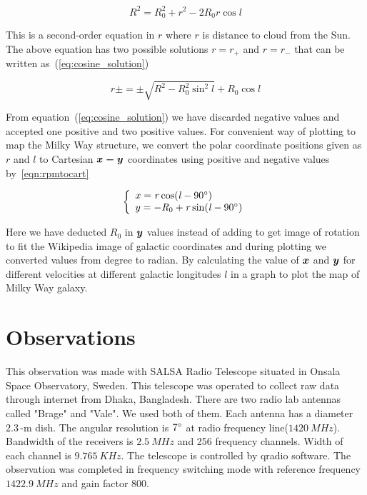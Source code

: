 \documentclass[fleqn,usenatbib]{mnras}
\begin{document}
\begin{equation}
 \mathit{R}^{2}=\mathit{R}_{0}^{2}+\mathit{r}^{2}-2\mathit{R}_{0}\mathit{r}\cos l
 \label{eq:cosine_theory}
\end{equation}

This is a second-order equation in $\mathit{r}$ where $\mathit{r}$ is distance to cloud from the Sun. The above equation has two possible solutions $\mathit{r}=\mathit{r}_{+}$ and $\mathit{r}=\mathit{r}_{-}$ that can be written as~(\ref{eq:cosine_solution})

\begin{equation}
 \mathit{r}\pm=\pm\sqrt{\mathit{R}^{2}-\mathit{R}_{0}^{2}\sin^{2} l}+\mathit{R}_{0}\cos l
 \label{eq:cosine_solution}
\end{equation}

From equation~(\ref{eq:cosine_solution}) we have discarded negative values and accepted one positive and two positive values. For convenient way of plotting to map the Milky Way structure, we convert the polar coordinate positions given as $\mathit{r}$ and $\mathit{l}$ to Cartesian $\bmath{x-y}$ coordinates using positive and negative values by~\ref{eqn:rpmtocart}

\begin{equation}
\left\lbrace
\begin{array}{l}
	x=\mathit{r} \cos (\mathit{l}-90\hbox{$^\circ$}) \\
	y=-\mathit{R}_{0}+\mathit{r} \sin (\mathit{l}-90\hbox{$^\circ$}) \\
\end{array}
\right.
\label{eqn:rpmtocart}
\end{equation}

Here we have deducted $\mathit{R}_{0}$ in $\bmath{y}$ values instead of adding to get image of rotation to fit the Wikipedia image of galactic coordinates and during plotting we converted values from degree to radian. By calculating the value of $\bmath{x}$ and $\bmath{y}$ for different velocities at different galactic longitudes $\mathit{l}$ in a graph to plot the map of Milky Way galaxy.

\section{Observations}

This observation was made with SALSA Radio Telescope situated in Onsala Space Observatory, Sweden. This telescope was operated to collect raw data through internet from Dhaka, Bangladesh. There are two radio lab antennas called "Brage" and "Vale". We used both of them. Each antenna has a diameter $2.3$\,-m dish. The angular resolution is $7\hbox{$^\circ$}$ at  radio frequency line($\SI{1420}{MHz}$). Bandwidth of the receivers is $\SI{2.5}{MHz}$ and 256 frequency channels. Width of each channel is $\SI{9.765}{KHz}$. The telescope is controlled by qradio software. The observation was completed in frequency switching mode with reference frequency $\SI{1422.9}{MHz}$ and gain factor $800$.
\end{document}
